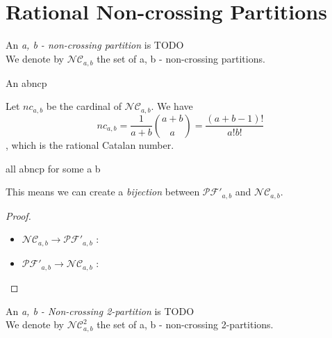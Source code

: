 \section{Rational Non-crossing Partitions}


\begin{definition}
    An \emph{a, b - non-crossing partition} is
    TODO\\
    We denote by $\mathcal{NC}_{a,b}$ the set of 
    a, b - non-crossing partitions.
\end{definition}

\begin{example}
    An abncp
\end{example}

\begin{theorem}
    Let $nc_{a,b}$ be the cardinal of $\mathcal{NC}_{a,b}$.
    We have $$nc_{a,b} = \frac{1}{a+b} \binom{a+b}{a} = 
    \frac{(a+b-1)!}{a!b!}$$, which is the rational Catalan
    number.
\end{theorem}

\begin{example}
    all abncp for some a b
\end{example}

\begin{prop}
    This means we can create a \emph{bijection} between
    $\mathcal{PF'}_{a,b}$ and $\mathcal{NC}_{a,b}$.
\end{prop}

\begin{proof}
    ~\\
\begin{itemize}
    \item $\mathcal{NC}_{a,b} \to \mathcal{PF'}_{a,b}$ :
    
    \item $\mathcal{PF'}_{a,b} \to \mathcal{NC}_{a,b}$ :
\end{itemize}
\end{proof}

\begin{definition}
    An \emph{a, b - Non-crossing 2-partition} is
    TODO\\
    We denote by $\mathcal{NC}^2_{a,b}$ the set of 
    a, b - non-crossing 2-partitions.
\end{definition}

